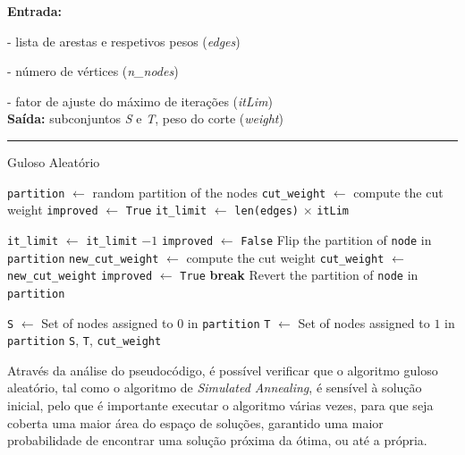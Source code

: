 \documentclass[mirror, portugues]{revdetua}
\begin{document}
\begin{algorithm}[H]
\raggedright
\textbf{Entrada:}

- lista de arestas e respetivos pesos (\textit{edges})

- número de vértices (\textit{n\_nodes})

- fator de ajuste do máximo de iterações (\textit{itLim})\\
\textbf{Saída:} subconjuntos \textit{S} e \textit{T}, peso do corte (\textit{weight}) \\
\hrule 
\caption{Guloso Aleatório}
\begin{algorithmic}[1]
    \State \texttt{partition} $\gets$ random partition of the nodes
    \State \texttt{cut\_weight} $\gets$ compute the cut weight
    \State \texttt{improved} $\gets$ \texttt{True}
    \State \texttt{it\_limit} $\gets$ \texttt{len(edges)} \ensuremath{\times} \texttt{itLim}

        \State \texttt{it\_limit} $\gets$ \texttt{it\_limit} $ - 1$
        \State \texttt{improved} $\gets$ \texttt{False}
            \State Flip the partition of \texttt{node} in \texttt{partition}
            \State \texttt{new\_cut\_weight} $\gets$ compute the cut weight
                \State \texttt{cut\_weight} $\gets$ \texttt{new\_cut\_weight}
                \State \texttt{improved} $\gets$ \texttt{True}
                \State \textbf{break}  
            \EndIf
            \State Revert the partition of \texttt{node} in \texttt{partition}
        \EndFor
    \EndWhile

    \State \texttt{S} $\gets$ Set of nodes assigned to $0$ in \texttt{partition}
    \State \texttt{T} $\gets$ Set of nodes assigned to $1$ in \texttt{partition}
    \Return \texttt{S}, \texttt{T}, \texttt{cut\_weight}
\end{algorithmic}
\end{algorithm}

Através da análise do pseudocódigo, é possível verificar que o algoritmo guloso aleatório, tal como o algoritmo de \textit{Simulated Annealing}, é sensível à solução inicial, pelo que é importante executar o algoritmo várias vezes, para que seja coberta uma maior área do espaço de soluções, garantido uma maior probabilidade de encontrar uma solução próxima da ótima, ou até a própria.
\end{document}
